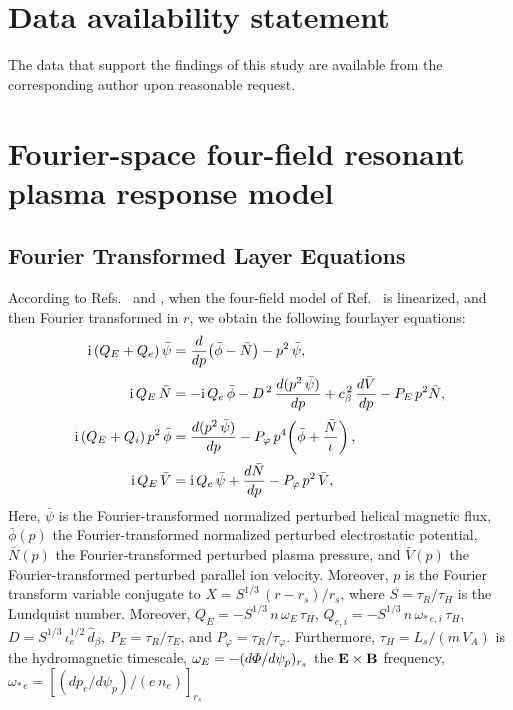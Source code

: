 \documentclass[12pt,prb,aps]{revtex4-1}
\begin{document}
\section*{Data availability statement}
The data that support the findings of this study are available from the corresponding author upon reasonable request.

\appendix
\section{Fourier-space four-field resonant plasma response model}\label{sfour}

\subsection{Fourier Transformed Layer Equations}
According to Refs.~ and , when the four-field model of Ref.~ is linearized, and then Fourier transformed in
$r$,  we obtain the following fourlayer equations:
\begin{align}\label{e314}
{\rm i}\,(Q_E+Q_e)\,\bar{\psi}&=\frac{d}{dp}\!\left(\bar{\phi}-\bar{N}\right)-p^2\,\bar{\psi},\\[0.5ex]
{\rm i}\,Q_E\,\bar{N} &= - {\rm i}\,Q_{e}\,\bar{\phi} -D^{\,2}\,\frac{d(p^2\,\bar{\psi})}{dp}+ c_\beta^{\,2}\,\frac{d\bar{V}}{dp}
  - P_E\,p^2\bar{N},\label{e316}\\[0.5ex]
{\rm i}\,(Q_E+Q_i)\,p^2\,\bar{\phi}&=  \frac{d(p^2\,\bar{\psi})}{dp}- P_\varphi\,p^4\!\left(\bar{\phi} + \frac{\bar{N}}{\iota}\right),\label{e316a}\\[0.5ex]
{\rm i}\,Q_E\,\bar{V} &= {\rm i}\,Q_{e}\,\bar{\psi} +\frac{d\bar{N}}{dp}- P_\varphi\,p^2\,\bar{V},\label{e317}
\end{align}
Here, $\bar{\psi}$ is the Fourier-transformed normalized perturbed helical magnetic flux, $\bar{\phi}(p)$  the Fourier-transformed normalized perturbed
electrostatic potential, $\bar{N}(p)$  the Fourier-transformed perturbed plasma pressure, and $\bar{V}(p)$  the Fourier-transformed perturbed parallel
ion velocity. Moreover, $p$ is the Fourier transform variable conjugate to $X=S^{1/3}\,(r-r_s)/r_s$, where $S=\tau_R/\tau_H$ is the Lundquist number. 
Moreover, $Q_E=-S^{1/3}\,n\,\omega_E\,\tau_H$, $Q_{e,i}=-S^{1/3}\,n\,\omega_{\ast\,e,i}\,\tau_H$, $D=S^{1/3}\,\iota_e^{1/2}\,\hat{d}_\beta$, 
$P_E=\tau_R/\tau_E$, and $P_\varphi=\tau_R/\tau_\varphi$. Furthermore, $\tau_H=L_s/(m\,V_A)$ is
the hydromagnetic timescale, $\omega_E=-(d{\mit\Phi}/d\psi_p)_{r_s}$ the ${\bf E}\times {\bf B}$ frequency, $\omega_{\ast\,e}=[(dp_e/d\psi_p)/(e\,n_e)]_{r_s}$
\end{document}
